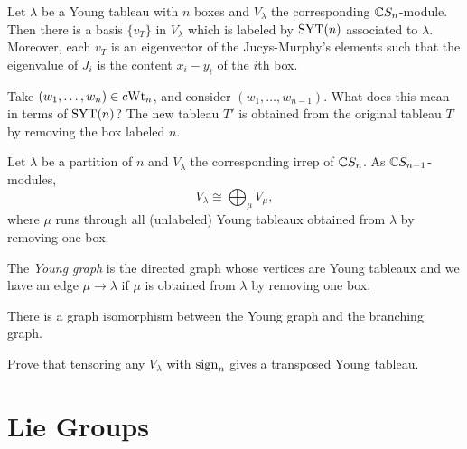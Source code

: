 \begin{corollary}
  Let $\lambda$ be a Young tableau with
  $n$ boxes and $V_\lambda$ the corresponding
  $\mathbb{C} S_n$-module. Then there is a basis
  $\{v_T\}$ in $V_\lambda$ which is labeled
  by $\operatorname{SYT}(n)$ associated to $\lambda$.
  Moreover, each $v_T$ is an eigenvector
  of the Jucys-Murphy's elements such that
  the eigenvalue of $J_i$ is the content
  $x_i - y_i$ of the $i$th box.
\end{corollary}

\begin{remark}
  Take
  $(w_1, \dots, w_n) \in c{\operatorname{Wt}_n}$, and
  consider $(w_1, \dots, w_{n - 1})$.
  What does this mean in terms of
  $\operatorname{SYT}(n)$? The new tableau $T'$ is
  obtained from the original tableau $T$
  by removing the box labeled $n$.
\end{remark}

\begin{corollary}
  Let $\lambda$ be a partition of $n$
  and $V_\lambda$ the corresponding
  irrep of $\mathbb{C} S_n$.
  As $\mathbb{C} S_{n - 1}$-modules,
  \[
    V_{\lambda}
    \cong \bigoplus_{\mu} V_{\mu},
  \]
  where $\mu$ runs through all
  (unlabeled) Young
  tableaux obtained from $\lambda$ by
  removing one box.
\end{corollary}

\begin{definition}
  The \emph{Young graph} is the directed
  graph whose vertices are Young
  tableaux and we have an edge
  $\mu \to \lambda$ if
  $\mu$ is obtained from $\lambda$
  by removing one box.
\end{definition}

\begin{corollary}
  There is a graph isomorphism
  between the Young graph and the
  branching graph.
\end{corollary}

\begin{exercise}
  Prove that tensoring any
  $V_\lambda$ with $\operatorname{sign}_n$ gives a
  transposed Young tableau.
\end{exercise}

\section{Lie Groups}

